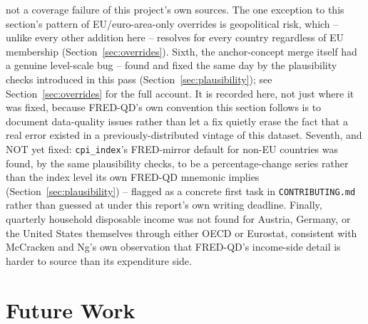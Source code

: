\documentclass[11pt]{article}
\begin{document}
not a coverage failure of this project's own sources. The one exception
to this section's pattern of EU/euro-area-only overrides is geopolitical
risk, which -- unlike every other addition here -- resolves for every
country regardless of EU membership (Section~\ref{sec:overrides}).
Sixth, the anchor-concept merge itself had a genuine level-scale bug --
found and fixed the same day by the plausibility checks introduced in
this pass (Section~\ref{sec:plausibility}); see Section~\ref{sec:overrides}
for the full account. It is recorded here, not just where it was fixed,
because FRED-QD's own convention this section follows is to document
data-quality issues rather than let a fix quietly erase the fact that a
real error existed in a previously-distributed vintage of this dataset.
Seventh, and NOT yet fixed: \texttt{cpi\_index}'s FRED-mirror default for
non-EU countries was found, by the same plausibility checks, to be a
percentage-change series rather than the index level its own FRED-QD
mnemonic implies (Section~\ref{sec:plausibility}) -- flagged as a
concrete first task in \texttt{CONTRIBUTING.md} rather than guessed at
under this report's own writing deadline.
Finally, quarterly household disposable income was not found for
Austria, Germany, or the United States themselves through either OECD or
Eurostat, consistent with McCracken and Ng's own observation that FRED-QD's
income-side detail is harder to source than its expenditure side.

\section{Future Work}
\label{sec:future}
\end{document}
